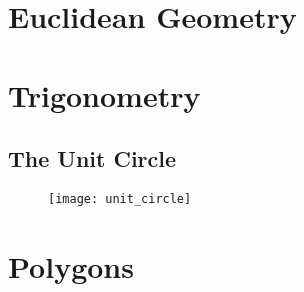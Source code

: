 \documentclass[../main]{subfiles}
\begin{document}
\section{Euclidean Geometry}

\section{Trigonometry}
\subsection{The Unit Circle}
\begin{figure}[h]
	\centering
	\texttt{[image: unit\_circle]}
\end{figure}

\section{Polygons}
\end{document}
